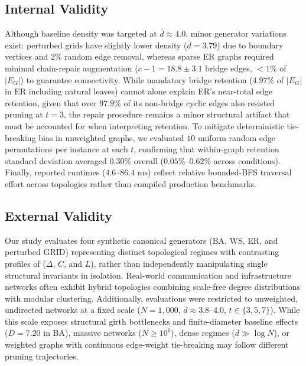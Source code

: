 \documentclass[conference]{IEEEtran}
\begin{document}
\subsection{Internal Validity}
Although baseline density was targeted at $\bar{d} \approx 4.0$, minor generator variations exist: perturbed grids have slightly lower density ($\bar{d} = 3.79$) due to boundary vertices and $2\%$ random edge removal, whereas sparse ER graphs required minimal chain-repair augmentation ($c - 1 = 18.8 \pm 3.1$ bridge edges, $< 1\%$ of $|E_G|$) to guarantee connectivity. While mandatory bridge retention ($4.97\%$ of $|E_G|$ in ER including natural leaves) cannot alone explain ER's near-total edge retention, given that over $97.9\%$ of its non-bridge cyclic edges also resisted pruning at $t = 3$, the repair procedure remains a minor structural artifact that must be accounted for when interpreting retention. To mitigate deterministic tie-breaking bias in unweighted graphs, we evaluated $10$ uniform random edge permutations per instance at each $t$, confirming that within-graph retention standard deviation averaged $0.30\%$ overall ($0.05\%\text{--}0.62\%$ across conditions). Finally, reported runtimes ($4.6\text{--}86.4\text{ ms}$) reflect relative bounded-BFS traversal effort across topologies rather than compiled production benchmarks.

\subsection{External Validity}
Our study evaluates four synthetic canonical generators (BA, WS, ER, and perturbed GRID) representing distinct topological regimes with contrasting profiles of ($\Delta$, $C$, and $L$), rather than independently manipulating single structural invariants in isolation. Real-world communication and infrastructure networks often exhibit hybrid topologies combining scale-free degree distributions with modular clustering. Additionally, evaluations were restricted to unweighted, undirected networks at a fixed scale ($N = 1,000$, $\bar{d} \approx 3.8\text{--}4.0$, $t \in \{3, 5, 7\}$). While this scale exposes structural girth bottlenecks and finite-diameter baseline effects ($D = 7.20$ in BA), massive networks ($N \ge 10^6$), dense regimes ($\bar{d} \gg \log N$), or weighted graphs with continuous edge-weight tie-breaking may follow different pruning trajectories.
\end{document}
